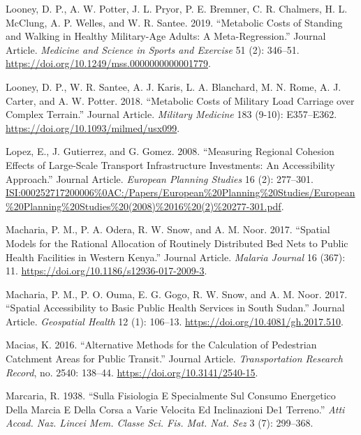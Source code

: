 \documentclass[]{elsarticle} %
\begin{document}
\leavevmode\hypertarget{ref-Looney2019metabolic}{}%
Looney, D. P., A. W. Potter, J. L. Pryor, P. E. Bremner, C. R. Chalmers,
H. L. McClung, A. P. Welles, and W. R. Santee. 2019. ``Metabolic Costs
of Standing and Walking in Healthy Military-Age Adults: A
Meta-Regression.'' Journal Article. \emph{Medicine and Science in Sports
and Exercise} 51 (2): 346--51.
\url{https://doi.org/10.1249/mss.0000000000001779}.

\leavevmode\hypertarget{ref-Looney2018metabolic}{}%
Looney, D. P., W. R. Santee, A. J. Karis, L. A. Blanchard, M. N. Rome,
A. J. Carter, and A. W. Potter. 2018. ``Metabolic Costs of Military Load
Carriage over Complex Terrain.'' Journal Article. \emph{Military
Medicine} 183 (9-10): E357--E362.
\url{https://doi.org/10.1093/milmed/usx099}.

\leavevmode\hypertarget{ref-Lopez2008}{}%
Lopez, E., J. Gutierrez, and G. Gomez. 2008. ``Measuring Regional
Cohesion Effects of Large-Scale Transport Infrastructure Investments: An
Accessibility Approach.'' Journal Article. \emph{European Planning
Studies} 16 (2): 277--301.
\url{ISI:000252717200006\%0AC:/Papers/European\%20Planning\%20Studies/European\%20Planning\%20Studies\%20(2008)\%2016\%20(2)\%20277-301.pdf}.

\leavevmode\hypertarget{ref-Macharia2017}{}%
Macharia, P. M., P. A. Odera, R. W. Snow, and A. M. Noor. 2017.
``Spatial Models for the Rational Allocation of Routinely Distributed
Bed Nets to Public Health Facilities in Western Kenya.'' Journal
Article. \emph{Malaria Journal} 16 (367): 11.
\url{https://doi.org/10.1186/s12936-017-2009-3}.

\leavevmode\hypertarget{ref-Macharia2017accessibility}{}%
Macharia, P. M., P. O. Ouma, E. G. Gogo, R. W. Snow, and A. M. Noor.
2017. ``Spatial Accessibility to Basic Public Health Services in South
Sudan.'' Journal Article. \emph{Geospatial Health} 12 (1): 106--13.
\url{https://doi.org/10.4081/gh.2017.510}.

\leavevmode\hypertarget{ref-Macias2016alternative}{}%
Macias, K. 2016. ``Alternative Methods for the Calculation of Pedestrian
Catchment Areas for Public Transit.'' Journal Article.
\emph{Transportation Research Record}, no. 2540: 138--44.
\url{https://doi.org/10.3141/2540-15}.

\leavevmode\hypertarget{ref-Marcaria1938sulla}{}%
Marcaria, R. 1938. ``Sulla Fisiologia E Specialmente Sul Consumo
Energetico Della Marcia E Della Corsa a Varie Velocita Ed Inclinazioni
De1 Terreno.'' \emph{Atti Accad. Naz. Lincei Mem. Classe Sci. Fis. Mat.
Nat. Sez} 3 (7): 299--368.
\end{document}
